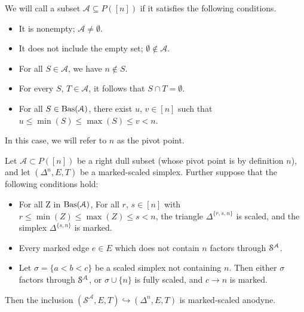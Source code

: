 \documentclass[main.tex]{subfiles}
\begin{document}
\begin{definition}
  We will call a subset $\mathcal{A} \subseteq P([n])$  if it satisfies the following conditions.
  \begin{itemize}
    \item It is nonempty; $\mathcal{A} \neq \emptyset$.

    \item It does not include the empty set; $\emptyset \notin \mathcal{A}$.

    \item For all $S \in \mathcal{A}$, we have $n \notin S$.

    \item For every $S$, $T \in \mathcal{A}$, it follows that $S \cap T = \emptyset$.

    \item For all $S \in \Bas(\mathcal{A})$, there exist $u$, $v \in [n]$ such that $u \leq \min(S) \leq \max(S) \leq v < n$.
  \end{itemize}

  In this case, we will refer to $n$ as the pivot point.
\end{definition}

\begin{lemma}
  \label{lemma:right-anodyne_pivot_trick}
  Let $\mathcal{A} \subset P([n])$ be a right dull subset (whose pivot point is by definition $n$), and let $(\Delta^{n}, E, T)$ be a marked-scaled simplex. Further suppose that the following conditions hold:
  \begin{itemize}
    \item For all Z in  $\Bas(\category{A})$, For all $r$, $s \in [n]$ with $r \leq \min(Z) \leq \max(Z) \leq s < n$, the triangle $\Delta^{\{r, s, n\}}$ is scaled, and the simplex $\Delta^{\{s, n\}}$ is marked.

    \item Every marked edge $e \in E$ which does not contain $n$ factors through $\S^{\mathcal{A}}$.

    \item Let $\sigma = \{a < b < c\}$ be a scaled simplex not containing $n$. Then either $\sigma$ factors through $\S^{\mathcal{A}}$, or $\sigma \cup \{n\}$ is fully scaled, and $c \to n$ is marked.
  \end{itemize}

  Then the inclusion $(\mathcal{S}^{\mathcal{A}}, E, T) \hookrightarrow (\Delta^{n}, E, T)$ is marked-scaled anodyne.
\end{lemma}
\end{document}
